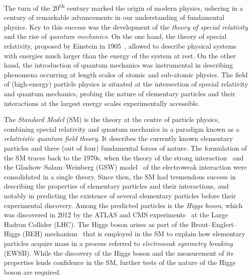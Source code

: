 The turn of the 20\textsuperscript{th} century marked the origin of modern
physics, ushering in a century of remarkable advancements in our understanding
of fundamental physics. Key to this success was the development of the
\emph{theory of special relativity} and the rise of \emph{quantum mechanics}. On
the one hand, the theory of special relativity, proposed by Einstein in
1905~\cite{einstein:1905zedbk,einstein:1905idtekvsea}, allowed to describe
physical systems with energies much larger than the energy of the system at
rest. On the other hand, the introduction of quantum mechanics was instrumental
in describing phenomena occurring at length scales of atomic and sub-atomic
physics. The field of (high-energy) particle physics is situated at the
intersection of special relativity and quantum mechanics, probing the nature of
elementary particles and their interactions at the largest energy scales
experimentally accessible.

The \emph{Standard Model} (SM) is the theory at the centre of particle physics,
combining special relativity and quantum mechanics in a paradigm known as a
\emph{relativistic quantum field theory}. It describes the currently known
elementary particles and three (out of four) fundamental forces of nature. The
formulation of the SM traces back to the 1970s, when the theory of the strong
interaction~\cite{Fritzsch:1973pi,Gross:1973id,Politzer:1973fx}
and the Glashow--Salam--Weinberg (GSW)
model~\cite{Glashow:1961tr,Salam:1964ry,Weinberg:1967tq} of the electroweak
interaction were consolidated in a single theory. Since then, the SM had
tremendous success in describing the properties of elementary particles and
their interactions, and notably in predicting the existence of several
elementary particles before their experimental discovery. Among the predicted
particles is the \emph{Higgs boson}, which was discovered in 2012 by the ATLAS
and CMS experiments~\cite{HIGG-2012-27,CMS-HIG-12-028} at the Large Hadron
Collider (LHC). The Higgs boson arises as part of the Brout--Englert--Higgs
(BEH) mechanism~\cite{Englert:1964et,Higgs:1964pj} that is employed in the SM to explain how elementary
particles acquire mass in a process referred to \emph{electroweak symmetry
  breaking} (EWSB).
While the discovery of the Higgs boson and the measurement of its properties
lends confidence in the SM, further tests of the nature of the Higgs boson are
required.

